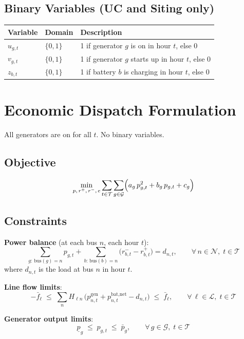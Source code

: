 \documentclass[11pt, letterpaper]{article}
\begin{document}
\subsection{Binary Variables (UC and Siting only)}

\begin{tabular}{@{}lll@{}}
  \toprule
  Variable & Domain & Description \\
  \midrule
  $u_{g,t}$ & $\{0,1\}$ & 1 if generator $g$ is on in hour $t$, else 0 \\
  $v_{g,t}$ & $\{0,1\}$ & 1 if generator $g$ starts up in hour $t$, else 0 \\
  $z_{b,t}$ & $\{0,1\}$ & 1 if battery $b$ is charging in hour $t$, else 0 \\
  \bottomrule
\end{tabular}

\section{Economic Dispatch Formulation}

All generators are on for all $t$. No binary variables.

\subsection{Objective}

\[
  \min_{p,\, r^+,\, r^-,\, e}
  \sum_{t \in \mathcal{T}} \sum_{g \in \mathcal{G}}
  \Bigl( a_g\, p_{g,t}^2 + b_g\, p_{g,t} + c_g \Bigr)
\]

\subsection{Constraints}

\textbf{Power balance} (at each bus $n$, each hour $t$):
\[
  \sum_{g:\, \text{bus}(g)=n} p_{g,t}
  + \sum_{b:\, \text{bus}(b)=n} \bigl(r^-_{b,t} - r^+_{b,t}\bigr)
  = d_{n,t},
  \qquad \forall\, n \in \mathcal{N},\; t \in \mathcal{T}
\]
where $d_{n,t}$ is the load at bus $n$ in hour $t$.

\textbf{Line flow limits}:
\[
  -\bar{f}_\ell \;\leq\; \sum_{n} H_{\ell n}\,
  \bigl(p^{\text{gen}}_{n,t} + p^{\text{bat,net}}_{n,t} - d_{n,t}\bigr)
  \;\leq\; \bar{f}_\ell,
  \qquad \forall\, \ell \in \mathcal{L},\; t \in \mathcal{T}
\]

\textbf{Generator output limits}:
\[
  \underline{p}_g \;\leq\; p_{g,t} \;\leq\; \bar{p}_g,
  \qquad \forall\, g \in \mathcal{G},\; t \in \mathcal{T}
\]
\end{document}
